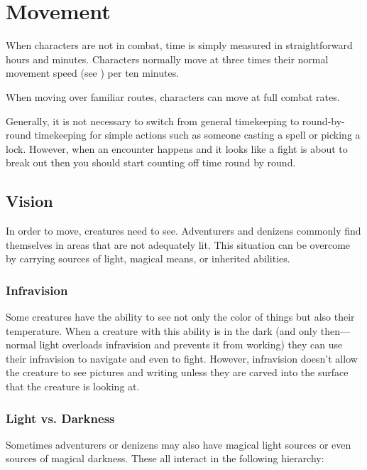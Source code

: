 \chapter[green]{Movement}
\label{chap:Movement}
\thispagestyle{plain}

\begin{multicols*}{2}
	When characters are not in combat, time is simply measured in straightforward hours and minutes. Characters normally move at three times their normal movement speed (see ) per ten minutes.


When moving over familiar routes, characters can move at full combat rates.

Generally, it is not necessary to switch from general timekeeping to round-by-round timekeeping for simple actions such as someone casting a spell or picking a lock. However, when an encounter happens and it looks like a fight is about to break out then you should start counting off time round by round.

\section{Vision}
In order to move, creatures need to see. Adventurers and denizens commonly find themselves in areas that are not adequately lit. This situation can be overcome by carrying sources of light, magical means, or inherited abilities.

\subsection{Infravision}\label{sec:Infravision}
Some creatures have the ability to see not only the color of things but also their temperature. When a creature with this ability is in the dark (and only then—normal light overloads infravision and prevents it from working) they can use their infravision to navigate and even to fight. However, infravision doesn’t allow the creature to see pictures and writing unless they are carved into the surface that the creature is looking at.

\subsection{Light vs. Darkness}\label{sec:Light vs. Darkness}
Sometimes adventurers or denizens may also have magical light sources or even sources of magical darkness. These all interact in the following hierarchy:


\end{multicols*}
